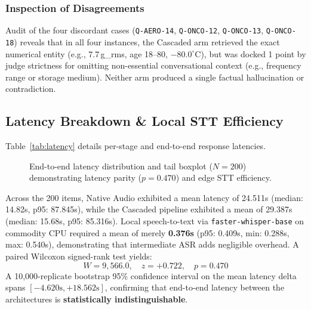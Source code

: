 \documentclass[10pt,a4paper,twocolumn]{article}
\begin{document}
\subsubsection{Inspection of Disagreements}
Audit of the four discordant cases (\texttt{Q-AERO-14}, \texttt{Q-ONCO-12}, \texttt{Q-ONCO-13}, \texttt{Q-ONCO-18}) reveals that in all four instances, the Cascaded arm retrieved the exact numerical entity (e.g., 7.7\,g\_rms, age 18--80, $-80.0^\circ$C), but was docked 1 point by judge strictness for omitting non-essential conversational context (e.g., frequency range or storage medium). Neither arm produced a single factual hallucination or contradiction.

\subsection{Latency Breakdown \& Local STT Efficiency}
Table~\ref{tab:latency} details per-stage and end-to-end response latencies.



\begin{figure}[t]
\centering
{}
\caption{End-to-end latency distribution and tail boxplot ($N = 200$) demonstrating latency parity ($p=0.470$) and edge STT efficiency.}
\label{fig:latency}
\end{figure}

Across the 200 items, Native Audio exhibited a mean latency of 24.511s (median: 14.82s, p95: 87.845s), while the Cascaded pipeline exhibited a mean of 29.387s (median: 15.68s, p95: 85.316s). Local speech-to-text via \texttt{faster-whisper-base} on commodity CPU required a mean of merely \textbf{0.376s} (p95: 0.409s, min: 0.288s, max: 0.540s), demonstrating that intermediate ASR adds negligible overhead. A paired Wilcoxon signed-rank test yields:
\begin{equation}
    W = 9,566.0, \quad z = +0.722, \quad p = 0.470
\end{equation}
A 10,000-replicate bootstrap 95\% confidence interval on the mean latency delta spans $[-4.620\text{s}, +18.562\text{s}]$, confirming that end-to-end latency between the architectures is \textbf{statistically indistinguishable}.
\end{document}
